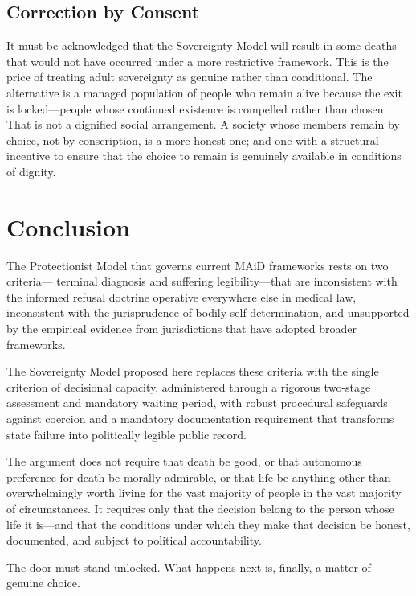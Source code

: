 \documentclass[11pt, letterpaper]{article}
\begin{document}
\subsection{Correction by Consent}

It must be acknowledged that the Sovereignty Model will result in some deaths that
would not have occurred under a more restrictive framework. This is the price of
treating adult sovereignty as genuine rather than conditional. The alternative is
a managed population of people who remain alive because the exit is locked---people
whose continued existence is compelled rather than chosen. That is not a dignified
social arrangement. A society whose members remain by choice, not by conscription,
is a more honest one; and one with a structural incentive to ensure that the choice
to remain is genuinely available in conditions of dignity.

\section{Conclusion}

The Protectionist Model that governs current MAiD frameworks rests on two criteria---
terminal diagnosis and suffering legibility---that are inconsistent with the informed
refusal doctrine operative everywhere else in medical law, inconsistent with the
jurisprudence of bodily self-determination, and unsupported by the empirical evidence
from jurisdictions that have adopted broader frameworks.

The Sovereignty Model proposed here replaces these criteria with the single criterion
of decisional capacity, administered through a rigorous two-stage assessment and
mandatory waiting period, with robust procedural safeguards against coercion and a
mandatory documentation requirement that transforms state failure into politically
legible public record.

The argument does not require that death be good, or that autonomous preference for
death be morally admirable, or that life be anything other than overwhelmingly worth
living for the vast majority of people in the vast majority of circumstances. It
requires only that the decision belong to the person whose life it is---and that the
conditions under which they make that decision be honest, documented, and subject to
political accountability.

The door must stand unlocked. What happens next is, finally, a matter of genuine choice.
\end{document}
